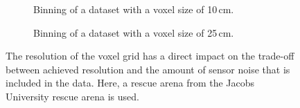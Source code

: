\begin{figure}
\begin{subfigure}[b]{0.28\textwidth}
    \caption{Binning of a dataset with a voxel size of 10\,cm.}
    \label{contributions:usar:binning:10}
\end{subfigure}
\hspace*{5mm}
\begin{subfigure}[b]{0.28\textwidth}
    \caption{Binning of a dataset with a voxel size of 25\,cm.}
    \label{contributions:usar:binning:25}
\end{subfigure}
\caption{The resolution of the voxel grid has a direct impact on the trade-off between achieved resolution and the amount of sensor noise that is included in the data.  Here, a rescue arena from the Jacobs University rescue arena is used.}
\label{contributions:usar:binning}
\end{figure}

